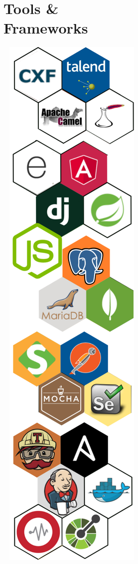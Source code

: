 \documentclass[]{friggeri-cv}
\begin{document}
\newpage

\begin{aside}
~
  \section{Tools \& \\Frameworks}
    ~
    \includegraphics[scale=0.2]{img/newTools2.png}
    ~

\end{aside}
\end{document}
